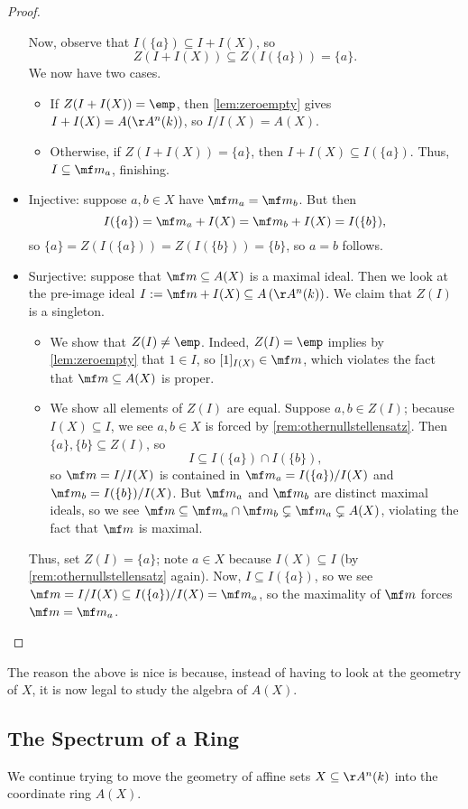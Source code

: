 \begin{proof}
\begin{itemize}
		Now, observe that $I(\{a\})\subseteq I+I(X)$, so
		\[Z(I+I(X))\subseteq Z(I(\{a\}))=\{a\}.\]
		We now have two cases.
		\begin{itemize}
			\item If $Z(I+I(X))=\emp$, then \autoref{lem:zeroempty} gives $I+I(X)=A(\AA^n(k))$, so $I/I(X)=A(X)$.
			\item Otherwise, if $Z(I+I(X))=\{a\}$, then $I+I(X)\subseteq I(\{a\})$. Thus, $I\subseteq\mf m_a$, finishing.
		\end{itemize}
		\item Injective: suppose $a,b\in X$ have $\mf m_a=\mf m_b$. But then
		\[I(\{a\})=\mf m_a+I(X)=\mf m_b+I(X)=I(\{b\}),\]
		so $\{a\}=Z(I(\{a\}))=Z(I(\{b\}))=\{b\}$, so $a=b$ follows.
		\item Surjective: suppose that $\mf m\subseteq A(X)$ is a maximal ideal. Then we look at the pre-image ideal $I:=\mf m+I(X)\subseteq A\left(\AA^n(k)\right)$. We claim that $Z(I)$ is a singleton.
		\begin{itemize}
			\item We show that $Z(I)\ne\emp$. Indeed, $Z(I)=\emp$ implies by \autoref{lem:zeroempty} that $1\in I$, so $[1]_{I(X)}\in\mf m$, which violates the fact that $\mf m\subseteq A(X)$ is proper.
			\item We show all elements of $Z(I)$ are equal. Suppose $a,b\in Z(I)$; because $I(X)\subseteq I$, we see $a,b\in X$ is forced by \autoref{rem:othernullstellensatz}. Then $\{a\},\{b\}\subseteq Z(I)$, so
			\[I\subseteq I(\{a\})\cap I(\{b\}),\]
			so $\mf m=I/I(X)$ is contained in $\mf m_a=I(\{a\})/I(X)$ and $\mf m_b=I(\{b\})/I(X)$. But $\mf m_a$ and $\mf m_b$ are distinct maximal ideals, so we see $\mf m\subseteq\mf m_a\cap\mf m_b\subsetneq\mf m_a\subsetneq A(X)$, violating the fact that $\mf m$ is maximal.
		\end{itemize}
		Thus, set $Z(I)=\{a\}$; note $a\in X$ because $I(X)\subseteq I$ (by \autoref{rem:othernullstellensatz} again). Now, $I\subseteq I(\{a\})$, so we see $\mf m=I/I(X)\subseteq I(\{a\})/I(X)=\mf m_a$, so the maximality of $\mf m$ forces $\mf m=\mf m_a$.
		\qedhere
	\end{itemize}
\end{proof}
The reason the above is nice is because, instead of having to look at the geometry of $X$, it is now legal to study the algebra of $A(X)$.

\subsection{The Spectrum of a Ring}
We continue trying to move the geometry of affine sets $X\subseteq\AA^n(k)$ into the coordinate ring $A(X)$.

